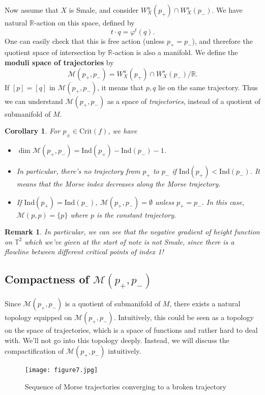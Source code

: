 \documentclass{article}
\newtheorem{corollary}[theorem]{Corollary}
\newtheorem{remark}[theorem]{Remark}
\newcommand{\R}{\mathbb{R}}
\newcommand{\T}{\mathbb{T}}
\newcommand{\vp}{\varphi}
\newcommand{\M}{\mathcal{M}}
\newcommand{\Crit}{\mathrm{Crit}}
\newcommand{\Ind}{\mathrm{Ind}}
\begin{document}
Now assume that $X$ is Smale, and consider $W^u_X(p_+)\cap W^s_X(p_-)$.
We have natural $\R$-action on this space, defined by
	$$t\cdot q=\vp^t(q).$$
One can easily check that this is free action (unless $p_+=p_-$), and therefore the quotient space of intersection by $\R$-action is also a manifold.
We define the \textbf{moduli space of trajectories} by
	$$\M(p_+,p_-)=W^u_X(p_+)\cap W^s_X(p_-)/\R.$$
If $[p]=[q]$ in $\M(p_+,p_-)$, it means that $p,q$ lie on the same trajectory.
Thus we can understand $\M(p_+,p_-)$ as a space of \emph{trajectories}, instead of a quotient of submanifold of $M$.

	\begin{corollary}\rm
	For $p_\pm\in\Crit(f)$, we have
	\begin{itemize}
	\item $\dim\M(p_+,p_-)=\Ind(p_+)-\Ind(p_-)-1$.
	\item In particular, there's no trajectory from $p_+$ to $p_-$ if $\Ind(p_+)<\Ind(p_-)$.
	It means that the Morse index decreases along the Morse trajectory.
	\item If $\Ind(p_+)=\Ind(p_-)$, $\M(p_+,p_-)=\emptyset$ unless $p_+=p_-$.
	In this case, $\M(p,p)=\{p\}$ where $p$ is the constant trajectory.
	\end{itemize}
	\end{corollary}

	\begin{remark}\rm
	In particular, we can see that the negative gradient of height function on $\T^2$ which we've given at the start of note is \emph{not} Smale, since there is a flowline between different critical points of index 1!
	\end{remark}



\subsection{Compactness of $\M(p_+,p_-)$}

Since $\M(p_+,p_-)$ is a quotient of submanifold of $M$, there exists a natural topology equipped on $\M(p_+,p_-)$.
Intuitively, this could be seen as a topology on the space of trajectories, which is a space of functions and rather hard to deal with.
We'll not go into this topology deeply.
Instead, we will discuss the compactification of $\M(p_+,p_-)$ intuitively.

\begin{figure}[h]
		\centering
		\texttt{[image: figure7.jpg]}
		\caption{Sequence of Morse trajectories converging to a broken trajectory}
\end{figure}
\end{document}
